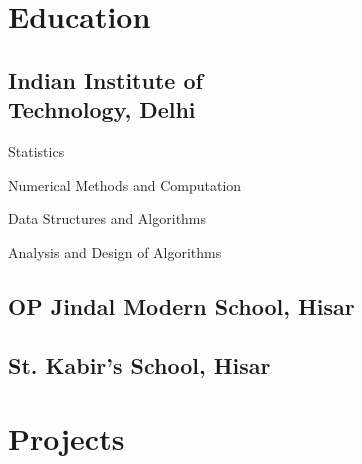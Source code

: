 \documentclass[]{plushcv}
\begin{document}
\begin{minipage}[t]{0.39\textwidth}


\section{Education} 

\subsection{Indian Institute of \\Technology, Delhi}
\vspace{\topsep} %
\begin{tightemize}
\sectionsep
\item Statistics
\item Numerical Methods and Computation
\item Data Structures and Algorithms
\item Analysis and Design of Algorithms
\end{tightemize}
\sectionsep

\subsection{OP Jindal Modern School, Hisar}
\sectionsep

\subsection{St. Kabir's School, Hisar}


\section{Projects}


\end{minipage}
\end{document}
